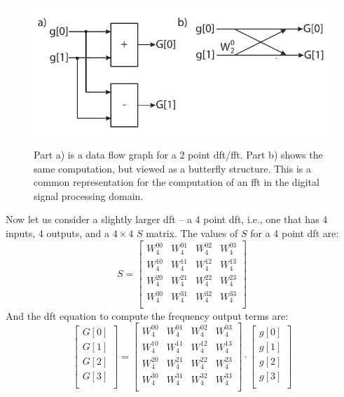 \begin{figure}
\centering
\includegraphics[width= 0.8 \textwidth]{images/2pointFFT}
\caption{Part a) is a data flow graph for a 2 point \gls{dft}/\gls{fft}. Part b) shows the same computation, but viewed as a butterfly structure. This is a common representation for the computation of an \gls{fft} in the digital signal processing domain.}
\label{fig:2pointFFT}
\end{figure}

Now let us consider a slightly larger \gls{dft} -- a 4 point \gls{dft}, i.e., one that has 4 inputs, 4 outputs, and a $4 \times 4$ $S$ matrix. The values of $S$ for a 4 point \gls{dft} are:
\begin{equation}
S =
 \begin{bmatrix}
  W^{0 0}_4 & W^{0 1}_4 & W^{0 2}_4 & W^{0 3}_4 \\
  W^{1 0}_4 & W^{1 1}_4 & W^{1 2}_4 & W^{1 3}_4 \\
  W^{2 0}_4 & W^{2 1}_4 & W^{2 2}_4 & W^{2 3}_4 \\
  W^{3 0}_4 & W^{3 1}_4 & W^{3 2}_4 & W^{3 3}_4 \\
 \end{bmatrix}
 \end{equation}
And the \gls{dft} equation to compute the frequency output terms are:
\begin{equation}
\begin{bmatrix} 
G[0] \\
G[1] \\
G[2] \\
G[3] \\
\end{bmatrix} = 
 \begin{bmatrix}
  W^{0 0}_4 & W^{0 1}_4 & W^{0 2}_4 & W^{0 3}_4 \\
  W^{1 0}_4 & W^{1 1}_4 & W^{1 2}_4 & W^{1 3}_4 \\
  W^{2 0}_4 & W^{2 1}_4 & W^{2 2}_4 & W^{2 3}_4 \\
  W^{3 0}_4 & W^{3 1}_4 & W^{3 2}_4 & W^{3 3}_4 \\
 \end{bmatrix}
 \cdot
  \begin{bmatrix}
  g[0] \\
  g[1]\\
  g[2]\\
  g[3]\\
\end{bmatrix}
\end{equation}


